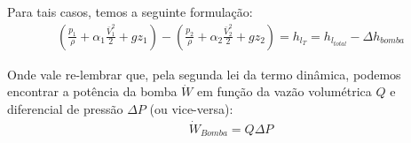 \documentclass{article}
\begin{document}
    Para tais casos, temos a seguinte formulação:
    \begin{align}
        \left(\frac{p_1}{\rho} + \alpha_1 \frac{\bar{V}^2_1}{2} + gz_1\right) - \left(\frac{p_2}{\rho} + \alpha_2 \frac{\bar{V}^2_2}{2} + gz_2\right) = h_{l_{T}} = h_{l_{total}} - \Delta h_{bomba}
    \end{align}

    Onde vale re-lembrar que, pela segunda lei da termo dinâmica, podemos encontrar a potência da bomba $\dot W$ em função da vazão volumétrica $Q$ e diferencial de pressão $\Delta P$ (ou vice-versa):
\begin{align}
    \dot W_{Bomba} = Q\Delta P
\end{align}
\end{document}
